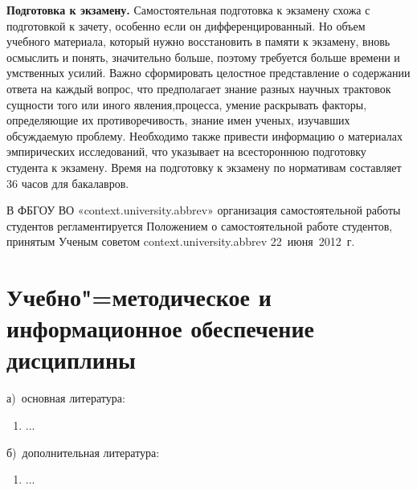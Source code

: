 \documentclass[12pt]{scrartcl}
\newcommand{\rdf}[2]{#2}
\newenvironment{rdfctx}[1]{}{}
\renewcommand{\paragraph}[1]{\par\textbf{#1}}
\begin{document}
\paragraph{Подготовка к экзамену.} Самостоятельная подготовка к экзамену схожа с
подготовкой к зачету, особенно если он дифференцированный. Но объем учебного
материала, который нужно восстановить в памяти к экзамену, вновь осмыслить и понять,
значительно больше, поэтому требуется больше времени и умственных усилий. Важно
сформировать целостное представление о содержании ответа на каждый вопрос, что
предполагает знание разных научных трактовок сущности того или иного явления,процесса, умение раскрывать факторы, определяющие их противоречивость, знание имен
ученых, изучавших обсуждаемую проблему. Необходимо также привести информацию о
материалах эмпирических исследований, что указывает на всестороннюю подготовку
студента к экзамену. Время на подготовку к экзамену по нормативам составляет 36 часов
для бакалавров.

В ФБГОУ ВО «{{context.university.abbrev}}» организация самостоятельной работы студентов
регламентируется Положением о самостоятельной работе студентов, принятым Ученым
советом {{context.university.abbrev}} 22~июня~2012~г.

\section{Учебно"=методическое и информационное обеспечение дисциплины}
\noindent а)\ основная литература:
\begin{rdfctx}{\rdfsetctx{list}{syll wpdd:itemList !wpdd:BaseReferenceList !wpdd:ItemList}}
  \begin{enumerate}
      \item \rdf{list ^schema:member !wpdd:ListItem !wpdd:Reference}{...}
  \end{enumerate}
\end{rdfctx}

\noindent б)\ дополнительная литература:
\begin{rdfctx}{\rdfsetctx{list}{syll wpdd:itemList !wpdd:AuxReferenceList !wpdd:ItemList}}
\begin{enumerate}
      \item \rdf{list ^schema:member !wpdd:ListItem !wpdd:Reference}{...}
\end{enumerate}
\end{rdfctx}
\end{document}
